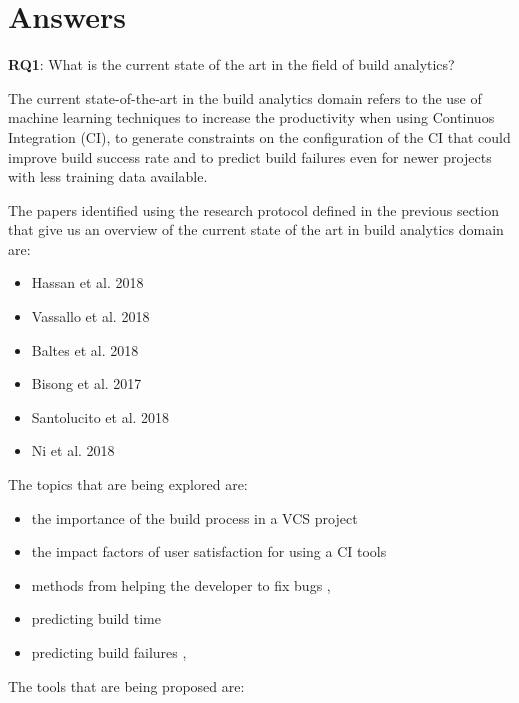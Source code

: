 \documentclass[]{book}
\providecommand{\tightlist}{%
  \setlength{\itemsep}{0pt}\setlength{\parskip}{0pt}}
\begin{document}
\section{Answers}\label{answers}

\textbf{RQ1}: What is the current state of the art in the field of build
analytics?

The current state-of-the-art in the build analytics domain refers to the
use of machine learning techniques to increase the productivity when
using Continuos Integration (CI), to generate constraints on the
configuration of the CI that could improve build success rate and to
predict build failures even for newer projects with less training data
available.

The papers identified using the research protocol defined in the
previous section that give us an overview of the current state of the
art in build analytics domain are:

\begin{itemize}
\tightlist
\item
  Hassan et al. 2018
\item
  Vassallo et al. 2018
\item
  Baltes et al. 2018
\item
  Bisong et al. 2017
\item
  Santolucito et al. 2018
\item
  Ni et al. 2018
\end{itemize}

The topics that are being explored are:

\begin{itemize}
\tightlist
\item
  the importance of the build process in a VCS project
  \citet{hassan2018hirebuild}
\item
  the impact factors of user satisfaction for using a CI tools
  \citet{widder2018m}
\item
  methods from helping the developer to fix bugs
  \citet{hassan2018hirebuild}, \citet{vassallo2018break}
\item
  predicting build time \citet{bisong2017built}
\item
  predicting build failures \citet{santolucito2018statically},
  \citet{ni2018acona}
\end{itemize}

The tools that are being proposed are:
\end{document}
